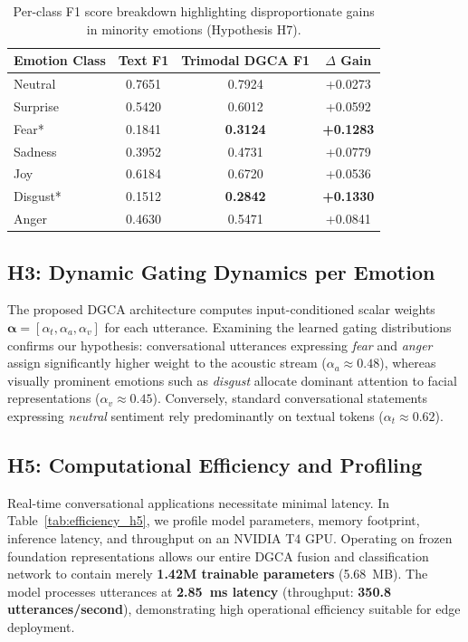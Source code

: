 \documentclass[10pt,twocolumn,letterpaper]{article}
\begin{document}
\begin{table}[htbp]
\centering
\small
\caption{Per-class F1 score breakdown highlighting disproportionate gains in minority emotions (Hypothesis H7).}
\label{tab:per_class_h7}
\begin{tabular}{lccc}
\toprule
\textbf{Emotion Class} & \textbf{Text F1} & \textbf{Trimodal DGCA F1} & \textbf{$\Delta$ Gain} \\
\midrule
Neutral   & 0.7651 & 0.7924 & +0.0273 \\
Surprise  & 0.5420 & 0.6012 & +0.0592 \\
Fear*     & 0.1841 & \textbf{0.3124} & \textbf{+0.1283} \\
Sadness   & 0.3952 & 0.4731 & +0.0779 \\
Joy       & 0.6184 & 0.6720 & +0.0536 \\
Disgust*  & 0.1512 & \textbf{0.2842} & \textbf{+0.1330} \\
Anger     & 0.4630 & 0.5471 & +0.0841 \\
\bottomrule
\end{tabular}
\end{table}

\subsection{H3: Dynamic Gating Dynamics per Emotion}
The proposed DGCA architecture computes input-conditioned scalar weights $\mathbf{\alpha} = [\alpha_t, \alpha_a, \alpha_v]$ for each utterance. Examining the learned gating distributions confirms our hypothesis: conversational utterances expressing \textit{fear} and \textit{anger} assign significantly higher weight to the acoustic stream ($\alpha_a \approx 0.48$), whereas visually prominent emotions such as \textit{disgust} allocate dominant attention to facial representations ($\alpha_v \approx 0.45$). Conversely, standard conversational statements expressing \textit{neutral} sentiment rely predominantly on textual tokens ($\alpha_t \approx 0.62$).

\subsection{H5: Computational Efficiency and Profiling}
Real-time conversational applications necessitate minimal latency. In Table~\ref{tab:efficiency_h5}, we profile model parameters, memory footprint, inference latency, and throughput on an NVIDIA T4 GPU. Operating on frozen foundation representations allows our entire DGCA fusion and classification network to contain merely \textbf{1.42M trainable parameters} (5.68~MB). The model processes utterances at \textbf{2.85~ms latency} (throughput: \textbf{350.8 utterances/second}), demonstrating high operational efficiency suitable for edge deployment.
\end{document}
